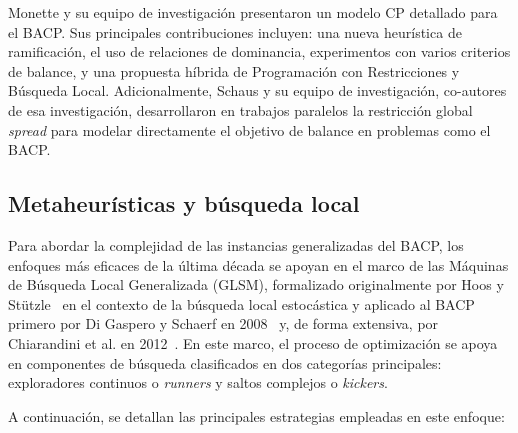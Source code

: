\documentclass[letter, 10pt]{article}
\begin{document}
Monette y su equipo de investigaci\'on \cite{Monette2007} presentaron un modelo CP detallado para el BACP. Sus principales contribuciones incluyen: una nueva heur\'istica de ramificaci\'on, el uso de relaciones de dominancia, experimentos con varios criterios de balance, y una propuesta h\'ibrida de Programaci\'on con Restricciones y B\'usqueda Local. Adicionalmente, Schaus y su equipo de investigaci\'on, co-autores de esa investigaci\'on, desarrollaron en trabajos paralelos la restricci\'on global \textit{spread} para modelar directamente el objetivo de balance en problemas como el BACP.



\subsection{Metaheur\'isticas y b\'usqueda local}
Para abordar la complejidad de las instancias generalizadas del BACP, los enfoques m\'as eficaces de la \'ultima d\'ecada se apoyan en el marco de las M\'aquinas de B\'usqueda Local Generalizada (GLSM), formalizado originalmente por Hoos y St\"utzle~\cite{hoos2005} en el contexto de la b\'usqueda local estoc\'astica y aplicado al BACP primero por Di Gaspero y Schaerf en 2008~\cite{digaspero2008} y, de forma extensiva, por Chiarandini et al. en 2012~\cite{Chiarandini2012}. En este marco, el proceso de optimizaci\'on se apoya en componentes de b\'usqueda clasificados en dos categor\'ias principales: exploradores continuos o \textit{runners} y saltos complejos o \textit{kickers}.

A continuaci\'on, se detallan las principales estrategias empleadas en este enfoque:
\end{document}
